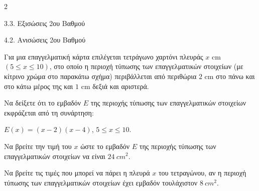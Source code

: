 \begin{ylh}{2}
    \item 3.3. Εξισώσεις 2ου Βαθμού
    \item 4.2. Ανισώσεις 2ου Βαθμού
\end{ylh}
{
Για μια επαγγελματική κάρτα επιλέγεται τετράγωνο χαρτόνι πλευράς $x$ cm $(5 \leq x \leq 10)$, στο οποίο η περιοχή τύπωσης των επαγγελματικών στοιχείων (με κίτρινο χρώμα στο παρακάτω σχήμα) περιβάλλεται από περιθώρια $2$ cm στο πάνω και στο κάτω μέρος της και $1$ cm δεξιά και αριστερά.
\begin{alist}
\item Να δείξετε ότι το εμβαδόν $E$ της περιοχής τύπωσης των επαγγελματικών στοιχείων εκφράζεται από τη συνάρτηση:

$E(x) = (x - 2)(x - 4)$, $5 \leq x \leq 10$.
\item Να βρείτε την τιμή του $x$ ώστε το εμβαδόν $E$ της περιοχής τύπωσης των επαγγελματικών στοιχείων να είναι $24\ cm^2$.
\item Να βρείτε τις τιμές που μπορεί να πάρει η πλευρά $x$ του τετραγώνου, αν η περιοχή τύπωσης των επαγγελματικών στοιχείων έχει εμβαδόν τουλάχιστον $8\ cm^2$.
\end{alist}}

